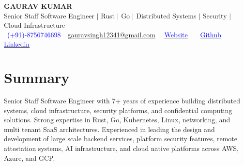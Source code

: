 \documentclass[12pt,a4paper]{article}
\begin{document}
\begin{center}
    {\textbf{\huge{GAURAV KUMAR}}} \\
    \vspace{0.05cm}
    Senior Staff Software Engineer $\vert$ Rust $\vert$ Go $\vert$ Distributed Systems $\vert$ Security $\vert$ Cloud Infrastructure \\
    \vspace{0.05cm}
    \faMobile \ \textcolor{blue}{(+91)-8756746698} \,\vert \, \href{mailto:gauravsingh12341@gmail.com}{\textnormal{ gauravsingh12341@gmail.com}} \, \vert
    \, \href{https://gausk.github.io}{\textcolor{blue}{\textnormal{Website}}} \, \vert \,
    \, \href{https://github.com/gausk}{\textcolor{blue}{\textnormal{Github}}} \, \vert \,
    \href{https://www.linkedin.com/in/96ab9136/}{\textcolor{blue}{\textnormal{Linkedin}}} \\
\end{center}

\vspace{-0.8cm}

\section*{Summary}

Senior Staff Software Engineer with 7+ years of experience building distributed systems, cloud infrastructure, security platforms, and confidential computing solutions. Strong expertise in Rust, Go, Kubernetes, Linux, networking, and multi tenant SaaS architectures. Experienced in leading the design and development of large scale backend services, platform security features, remote attestation systems, AI infrastructure, and cloud native platforms across AWS, Azure, and GCP.


\vspace{-0.5cm}
\end{document}
